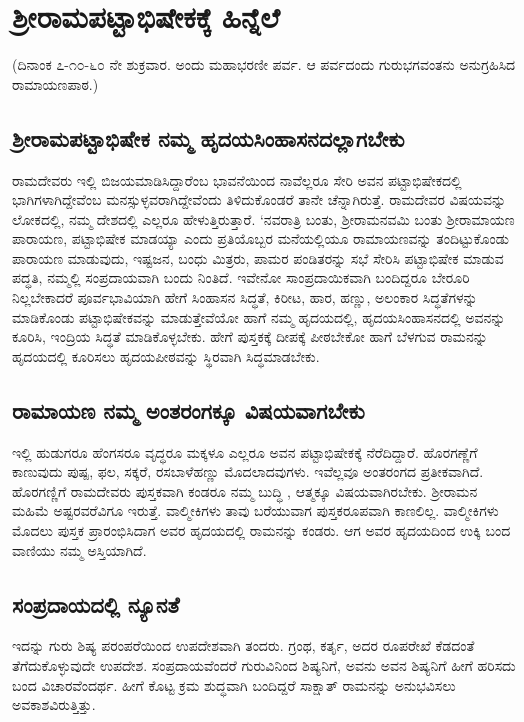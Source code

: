 \chapter{ಶ್ರೀರಾಮಪಟ್ಟಾಭಿಷೇಕಕ್ಕೆ ಹಿನ್ನೆಲೆ}

(ದಿನಾಂಕ ೭-೧೦-೬೦ ನೇ ಶುಕ್ರವಾರ. ಅಂದು ಮಹಾಭರಣೀ ಪರ್ವ. ಆ ಪರ್ವದಂದು ಗುರುಭಗವಂತನು ಅನುಗ್ರಹಿಸಿದ ರಾಮಾಯಣಪಾಠ.)

\section*{ಶ್ರೀರಾಮಪಟ್ಟಾಭಿಷೇಕ ನಮ್ಮ ಹೃದಯಸಿಂಹಾಸನದಲ್ಲಾಗಬೇಕು}

ರಾಮದೇವರು ಇಲ್ಲಿ ಬಿಜಯಮಾಡಿಸಿದ್ದಾರೆಂಬ ಭಾವನೆಯಿಂದ ನಾವೆಲ್ಲರೂ ಸೇರಿ ಅವನ ಪಟ್ಟಾಭಿಷೇಕದಲ್ಲಿ ಭಾಗಿಗಳಾಗಿದ್ದೇವೆಂಬ ಮನಸ್ಸುಳ್ಳವರಾಗಿದ್ದೇವೆಂದು ತಿಳಿದುಕೊಂಡರೆ ತಾನೇ ಚೆನ್ನಾಗಿರುತ್ತೆ. ರಾಮದೇವರ ವಿಷಯವನ್ನು ಲೋಕದಲ್ಲಿ, ನಮ್ಮ ದೇಶದಲ್ಲಿ ಎಲ್ಲರೂ ಹೇಳುತ್ತಿರುತ್ತಾರೆ. `ನವರಾತ್ರಿ ಬಂತು, ಶ್ರೀರಾಮನವಮಿ ಬಂತು ಶ್ರೀರಾಮಾಯಣ ಪಾರಾಯಣ, ಪಟ್ಟಾಭಿಷೇಕ ಮಾಡಯ್ಯಾ ಎಂದು ಪ್ರತಿಯೊಬ್ಬರ ಮನೆಯಲ್ಲಿಯೂ ರಾಮಾಯಣವನ್ನು ತಂದಿಟ್ಟುಕೊಂಡು ಪಾರಾಯಣ ಮಾಡುವುದು, ಇಷ್ಟಜನ, ಬಂಧು ಮಿತ್ರರು, ಪಾಮರ ಪಂಡಿತರನ್ನು ಸಭೆ ಸೇರಿಸಿ ಪಟ್ಟಾಭಿಷೇಕ ಮಾಡುವ ಪದ್ಧತಿ, ನಮ್ಮಲ್ಲಿ ಸಂಪ್ರದಾಯವಾಗಿ ಬಂದು ನಿಂತಿದೆ. ಇವೇನೋ ಸಾಂಪ್ರದಾಯಿಕವಾಗಿ ಬಂದಿದ್ದರೂ ಬೇರೂರಿ ನಿಲ್ಲಬೇಕಾದರೆ ಪೂರ್ವಭಾವಿಯಾಗಿ ಹೇಗೆ ಸಿಂಹಾಸನ ಸಿದ್ಧತೆ, ಕಿರೀಟ, ಹಾರ, ಹಣ್ಣು, ಅಲಂಕಾರ ಸಿದ್ಧತೆಗಳನ್ನು ಮಾಡಿಕೊಂಡು ಪಟ್ಟಾಭಿಷೇಕವನ್ನು ಮಾಡುತ್ತೇವೆಯೋ ಹಾಗೆ ನಮ್ಮ ಹೃದಯದಲ್ಲಿ, ಹೃದಯಸಿಂಹಾಸನದಲ್ಲಿ ಅವನನ್ನು ಕೂರಿಸಿ, ಇಂದ್ರಿಯ ಸಿದ್ಧತೆ ಮಾಡಿಕೊಳ್ಳಬೇಕು. ಹೇಗೆ ಪುಸ್ತಕಕ್ಕೆ ದೀಪಕ್ಕೆ ಪೀಠಬೇಕೋ ಹಾಗೆ ಬೆಳಗುವ ರಾಮನನ್ನು ಹೃದಯದಲ್ಲಿ ಕೂರಿಸಲು ಹೃದಯಪೀಠವನ್ನು ಸ್ಥಿರವಾಗಿ ಸಿದ್ಧಮಾಡಬೇಕು.

\section*{ರಾಮಾಯಣ ನಮ್ಮ ಅಂತರಂಗಕ್ಕೂ ವಿಷಯವಾಗಬೇಕು}

ಇಲ್ಲಿ ಹುಡುಗರೂ ಹೆಂಗಸರೂ ವೃದ್ಧರೂ ಮಕ್ಕಳೂ ಎಲ್ಲರೂ ಅವನ ಪಟ್ಟಾಭಿಷೇಕಕ್ಕೆ ನೆರೆದಿದ್ದಾರೆ. ಹೊರಗಣ್ಣೆಗೆ ಕಾಣುವುದು ಪುಷ್ಪ, ಫಲ, ಸಕ್ಕರೆ, ರಸಬಾಳೆಹಣ್ಣು ಮೊದಲಾದವುಗಳು. ಇವೆಲ್ಲವೂ ಅಂತರಂಗದ ಪ್ರತೀಕವಾಗಿದೆ. ಹೊರಗಣ್ಣಿಗೆ ರಾಮದೇವರು ಪುಸ್ತಕವಾಗಿ ಕಂಡರೂ ನಮ್ಮ ಬುದ್ಧಿ , ಆತ್ಮಕ್ಕೂ ವಿಷಯವಾಗಿರಬೇಕು. ಶ್ರೀರಾಮನ ಮಹಿಮೆ ಅಷ್ಟರವರೆವಿಗೂ ಇರುತ್ತೆ. ವಾಲ್ಮೀಕಿಗಳು ತಾವು ಬರೆಯುವಾಗ ಪುಸ್ತಕರೂಪವಾಗಿ ಕಾಣಲಿಲ್ಲ. ವಾಲ್ಮೀಕಿಗಳು ಮೊದಲು ಪುಸ್ತಕ ಪ್ರಾರಂಭಿಸಿದಾಗ ಅವರ ಹೃದಯದಲ್ಲಿ ರಾಮನನ್ನು ಕಂಡರು. ಆಗ ಅವರ ಹೃದಯದಿಂದ ಉಕ್ಕಿ ಬಂದ ವಾಣಿಯು ನಮ್ಮ ಅಸ್ತಿಯಾಗಿದೆ.

\section*{ಸಂಪ್ರದಾಯದಲ್ಲಿ ನ್ಯೂನತೆ}

ಇದನ್ನು ಗುರು ಶಿಷ್ಯ ಪರಂಪರೆಯಿಂದ ಉಪದೇಶವಾಗಿ ತಂದರು. ಗ್ರಂಥ, ಕರ್ತೃ, ಅದರ ರೂಪರೇಖೆ ಕೆಡದಂತೆ ತೆಗೆದುಕೊಳ್ಳುವುದೇ ಉಪದೇಶ. ಸಂಪ್ರದಾಯವೆಂದರೆ ಗುರುವಿನಿಂದ ಶಿಷ್ಯನಿಗೆ, ಅವನು ಅವನ ಶಿಷ್ಯನಿಗೆ ಹೀಗೆ ಹರಿಸದು ಬಂದ ವಿಚಾರವೆಂದರ್ಥ. ಹೀಗೆ ಕೊಟ್ಟ ಕ್ರಮ ಶುದ್ಧವಾಗಿ ಬಂದಿದ್ದರೆ ಸಾಕ್ಷಾತ್ ರಾಮನನ್ನು ಅನುಭವಿಸಲು ಅವಕಾಶವಿರುತ್ತಿತ್ತು.

